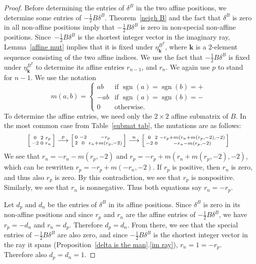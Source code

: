 \documentclass{amsart}
\theoremstyle{definition}
\theoremstyle{remark}
\numberwithin{equation}{section}
\newcommand{\sgn}{\operatorname{sgn}}
\newcommand{\0}{{\mathbf{0}}}
\newcommand{\kk}{{\boldsymbol{k}}}
\begin{document}
\begin{proof}
Before determining the entries of $\delta^B$ in the two affine positions, we determine some entries of $-\frac12B\delta^B$.
Theorem~\ref{neigh B} and the fact that $\delta^B$ is zero in all non-affine positions imply that $-\frac12B\delta^B$ is zero in non-special non-affine positions.
Since~$-\frac12B\delta^B$ is the shortest integer vector in the imaginary ray, Lemma~\ref{affine mut} implies that it is fixed under $\eta^{B^T}_\kk$, where $\kk$ is a $2$-element sequence consisting of the two affine indices. 
We use the fact that $-\frac12B\delta^B$ is fixed under $\eta^{B^T}_\kk$ to determine its affine entries $r_{n-1}$, and $r_n$.
We again use $p$ to stand for $n-1$.
We use the notation 
\[m(a,b)=\begin{cases}
ab&\text{if }\sgn(a)=\sgn(b)=+\\
-ab&\text{if }\sgn(a)=\sgn(b)=-\\
0&\text{otherwise}.
\end{cases}\]
To determine the affine entries, we need only the $2\times2$ affine submatrix of $B$.
In the most common case from Table~\ref{submat tab}, the mutations are as follows:
\[
\begin{bsmallmatrix*}
0 & 2 & r_p\\
-2 & 0 & r_n
\end{bsmallmatrix*}\overset{p}{\longrightarrow}
\begin{bsmallmatrix*}
0 & -2 & -r_p\\
2 & 0 & r_n+m(r_p,-2)
\end{bsmallmatrix*}\overset{n}{\longrightarrow}
\begin{bsmallmatrix*}
0 & 2 & -r_p+m(r_n+m(r_p,-2),-2)\\
-2 & 0 & -r_n-m(r_p,-2)
\end{bsmallmatrix*}
\]
We see that $r_n=-r_n-m(r_p,-2)$ and $r_p=-r_p+m(r_n+m(r_p,-2),-2)$, which can be rewritten $r_p=-r_p+m(-r_n,-2)$.
If $r_p$ is positive, then $r_n$ is zero, and thus also $r_p$ is zero.
By this contradiction, we see that $r_p$ is nonpositive.
Similarly, we see that $r_n$ is nonnegative.
Thus both equations say $r_n=-r_p$.

Let $d_p$ and $d_n$ be the entries of $\delta^B$ in its affine positions.
Since $\delta^B$ is zero in its non-affine positions and since $r_p$ and $r_n$ are the affine entries of $-\frac12B\delta^B$, we have $r_p=-d_n$ and $r_n=d_p$.
Therefore $d_p=d_n$.
From there, we see that the special entries of $-\frac12B\delta^B$ are also zero, and since $-\frac12B\delta^B$ is the shortest integer vector in the ray it spans (Proposition~\ref{delta is the man}.\ref{im ray}), $r_n=1=-r_p$.
Therefore also $d_p=d_n=1$.


\end{proof}
\end{document}
